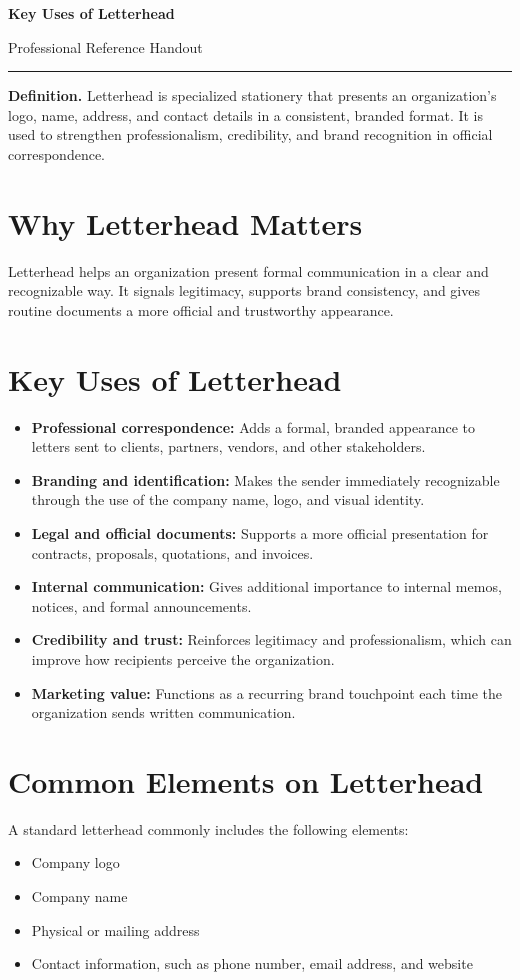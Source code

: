\documentclass[11pt]{article}
\newcommand{\handouttitle}[1]{%
  {\Huge\bfseries\color{accent} #1}\par
  \vspace{0.5em}
  {\large Professional Reference Handout}\par
  \vspace{0.75em}
  \hrule
  \vspace{1em}
}
\begin{document}
\sloppy

\handouttitle{Key Uses of Letterhead}

\textbf{Definition.} Letterhead is specialized stationery that presents an organization's logo, name, address, and contact details in a consistent, branded format. It is used to strengthen professionalism, credibility, and brand recognition in official correspondence.

\section*{Why Letterhead Matters}
Letterhead helps an organization present formal communication in a clear and recognizable way. It signals legitimacy, supports brand consistency, and gives routine documents a more official and trustworthy appearance.

\section*{Key Uses of Letterhead}
\begin{itemize}[leftmargin=1.5em]
    \item \textbf{Professional correspondence:} Adds a formal, branded appearance to letters sent to clients, partners, vendors, and other stakeholders.
    \item \textbf{Branding and identification:} Makes the sender immediately recognizable through the use of the company name, logo, and visual identity.
    \item \textbf{Legal and official documents:} Supports a more official presentation for contracts, proposals, quotations, and invoices.
    \item \textbf{Internal communication:} Gives additional importance to internal memos, notices, and formal announcements.
    \item \textbf{Credibility and trust:} Reinforces legitimacy and professionalism, which can improve how recipients perceive the organization.
    \item \textbf{Marketing value:} Functions as a recurring brand touchpoint each time the organization sends written communication.
\end{itemize}

\section*{Common Elements on Letterhead}
A standard letterhead commonly includes the following elements:
\begin{itemize}[leftmargin=1.5em]
    \item Company logo
    \item Company name
    \item Physical or mailing address
    \item Contact information, such as phone number, email address, and website
\end{itemize}
\end{document}
